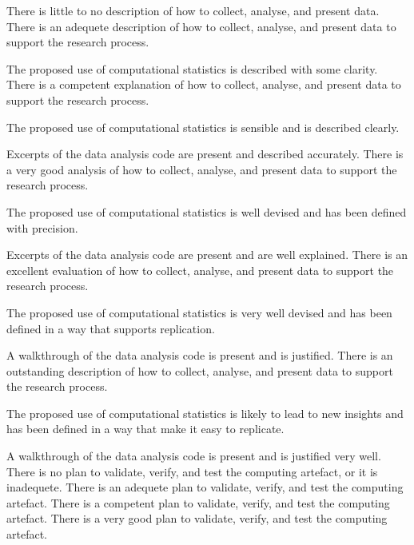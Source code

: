 \begin{markingrubric}
        \grade\fail 	There is little to no description of how to collect, analyse, and present data.
        \grade 		There is an adequete description of how to collect, analyse, and present data to support the research process.
         \par		The proposed use of computational statistics is described with some clarity.        
        \grade 		There is a competent explanation of how to collect, analyse, and present data to support the research process.
         \par		The proposed use of computational statistics is sensible and is described clearly.         
        \par		Excerpts of the data analysis code are present and described accurately.                 
        \grade 		There is a very good analysis of how to collect, analyse, and present data to support the research process.
         \par		The proposed use of computational statistics is well devised and has been defined with precision.                  
        \par		Excerpts of the data analysis code are present and are well explained.   
        \grade 		There is an excellent evaluation of how to collect, analyse, and present data to support the research process.
         \par		The proposed use of computational statistics is very well devised and has been defined in a way that supports replication.      
        \par		A walkthrough of the data analysis code is present and is justified.   
        \grade 		There is an outstanding description of how to collect, analyse, and present data to support the research process.
         \par		The proposed use of computational statistics is likely to lead to new insights and has been defined in a way that make it easy to replicate.        
        \par		A walkthrough of the data analysis code is present and is justified very well. 
%
        \grade\fail 	There is no plan to validate, verify, and test the computing artefact, or it is inadequete.
        \grade 		There is an adequete plan to validate, verify, and test the computing artefact.
        \grade 		There is a competent plan to validate, verify, and test the computing artefact.
        \grade 		There is a very good plan to validate, verify, and test the computing artefact.

\end{markingrubric}
